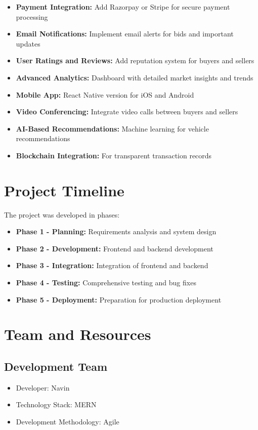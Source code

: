 \begin{itemize}
    \item \textbf{Payment Integration:} Add Razorpay or Stripe for secure payment processing
    \item \textbf{Email Notifications:} Implement email alerts for bids and important updates
    \item \textbf{User Ratings and Reviews:} Add reputation system for buyers and sellers
    \item \textbf{Advanced Analytics:} Dashboard with detailed market insights and trends
    \item \textbf{Mobile App:} React Native version for iOS and Android
    \item \textbf{Video Conferencing:} Integrate video calls between buyers and sellers
    \item \textbf{AI-Based Recommendations:} Machine learning for vehicle recommendations
    \item \textbf{Blockchain Integration:} For transparent transaction records
\end{itemize}

\section{Project Timeline}

The project was developed in phases:

\begin{itemize}
    \item \textbf{Phase 1 - Planning:} Requirements analysis and system design
    \item \textbf{Phase 2 - Development:} Frontend and backend development
    \item \textbf{Phase 3 - Integration:} Integration of frontend and backend
    \item \textbf{Phase 4 - Testing:} Comprehensive testing and bug fixes
    \item \textbf{Phase 5 - Deployment:} Preparation for production deployment
\end{itemize}

\section{Team and Resources}

\subsection{Development Team}
\begin{itemize}
    \item Developer: Navin
    \item Technology Stack: MERN
    \item Development Methodology: Agile
\end{itemize}

